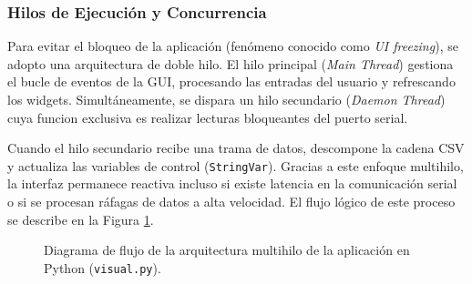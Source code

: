 \documentclass[conference]{IEEEtran}
\begin{document}
\subsubsection{Hilos de Ejecución y Concurrencia}
Para evitar el bloqueo de la aplicación (fenómeno conocido como \textit{UI freezing}), se adopto una arquitectura de doble hilo. El hilo principal (\textit{Main Thread}) gestiona el bucle de eventos de la GUI, procesando las entradas del usuario y refrescando los widgets. Simultáneamente, se dispara un hilo secundario (\textit{Daemon Thread}) cuya funcion exclusiva es realizar lecturas bloqueantes del puerto serial.

Cuando el hilo secundario recibe una trama de datos, descompone la cadena CSV y actualiza las variables de control (\texttt{StringVar}). Gracias a este enfoque multihilo, la interfaz permanece reactiva incluso si existe latencia en la comunicación serial o si se procesan ráfagas de datos a alta velocidad. El flujo lógico de este proceso se describe en la Figura \ref{fig:flow_python}.

\begin{figure}[htbp]
    \centering
    \caption{Diagrama de flujo de la arquitectura multihilo de la aplicación en Python (\texttt{visual.py}).}
    \label{fig:flow_python}
\end{figure}
\end{document}

